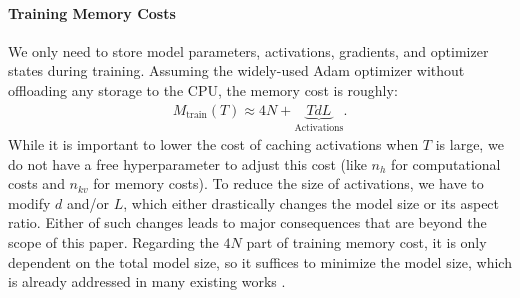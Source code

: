 \paragraph{Training Memory Costs} 

We only need to store model parameters, activations, gradients, and optimizer states during training. Assuming the widely-used Adam \citep{adam} optimizer without offloading any storage to the CPU, the memory cost is roughly:
\begin{align}
M_\text{train}(T) \approx 4N + \underbrace{TdL}_\text{Activations}.
\end{align}
While it is important to lower the cost of caching activations when $T$ is large, we do not have a free hyperparameter to adjust this cost (like $n_h$ for computational costs and $n_{kv}$ for memory costs). To reduce the size of activations, we have to modify $d$ and/or $L$, which either drastically changes the model size or its aspect ratio. Either of such changes leads to major consequences that are beyond the scope of this paper. Regarding the $4N$ part of training memory cost, it is only dependent on the total model size, so it suffices to minimize the model size, which is already addressed in many existing works \citep{scaling-law,llama3,beyond-chinchilla}.











